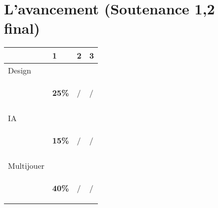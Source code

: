 \documentclass[12pt]{report}
\begin{document}
        \section{L'avancement (Soutenance 1,2 final)} 
            \begin{center}
            \begin{tabular}{|p{2 cm}||p{2.5cm}|p{2.5cm}|p{2.5cm}|}
             \hline
             & 1 & 2 & 3
             \\
             \hline \hline Design
                & & & 
                \\
                & \begin{center}
                     \textbf{\Huge25\%}
                  \end{center}
                & \begin{center}
                    /
                \end{center}& \begin{center}
                    /
                \end{center}
                \\
                & & &
                \\
            \hline IA
                & & &
                \\
                & \begin{center}
                    \textbf{\Huge15\%}
                \end{center}
                & \begin{center}
                    /
                \end{center} & \begin{center}
                    /
                \end{center}
                \\
                    & & &
                \\
            \hline Multijouer
                & & &
                \\
                & \begin{center}
                    \textbf{\Huge40\%}
                \end{center} & \begin{center}
                    /
                \end{center}
                & \begin{center}
                    /
                \end{center}
                \\

\end{tabular}
\end{center}
\end{document}
